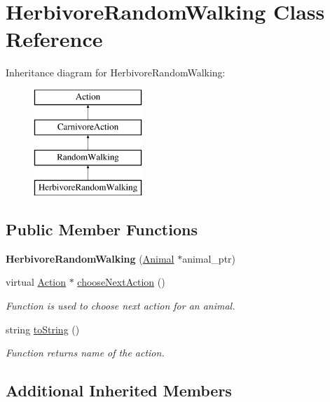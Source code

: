 \hypertarget{class_herbivore_random_walking}{}\section{Herbivore\+Random\+Walking Class Reference}
\label{class_herbivore_random_walking}
Inheritance diagram for Herbivore\+Random\+Walking\+:\begin{figure}[H]
\begin{center}
\leavevmode
\includegraphics[height=4.000000cm]{class_herbivore_random_walking}
\end{center}
\end{figure}
\subsection*{Public Member Functions}
\begin{DoxyCompactItemize}
\item 
\hypertarget{class_herbivore_random_walking_afefda07f0ba064504e2632e61e878688}{}{\bfseries Herbivore\+Random\+Walking} (\hyperlink{class_animal}{Animal} $\ast$animal\+\_\+ptr)\label{class_herbivore_random_walking_afefda07f0ba064504e2632e61e878688}

\item 
virtual \hyperlink{class_action}{Action} $\ast$ \hyperlink{class_herbivore_random_walking_aabb756e01d8d8a7f92ecaef6128a4a2c}{choose\+Next\+Action} ()
\begin{DoxyCompactList}\small\item\em Function is used to choose next action for an animal. \end{DoxyCompactList}\item 
string \hyperlink{class_herbivore_random_walking_a27a17f1ee3d5df3103f3348523c4801a}{to\+String} ()
\begin{DoxyCompactList}\small\item\em Function returns name of the action. \end{DoxyCompactList}\end{DoxyCompactItemize}
\subsection*{Additional Inherited Members}


